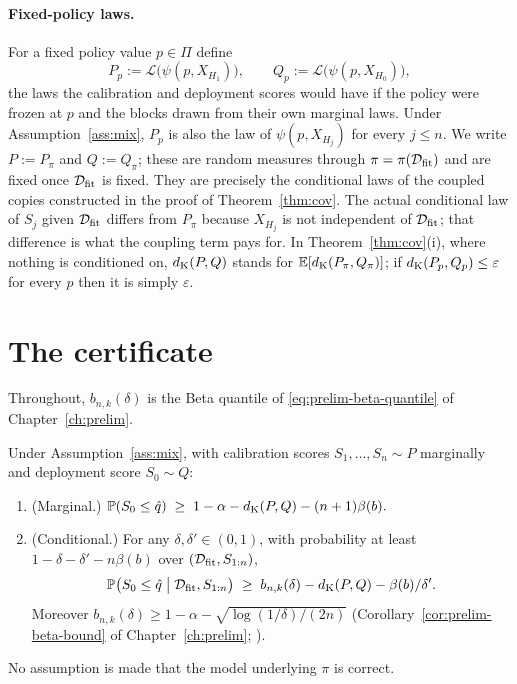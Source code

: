 \documentclass[../../../main.tex]{subfiles}
\begin{document}
\paragraph{Fixed-policy laws.} For a fixed policy value $p\in\Pi$ define
\[
P_p:=\mathcal L\big(\psi(p,X_{H_1})\big),\qquad Q_p:=\mathcal L\big(\psi(p,X_{H_0})\big),
\]
the laws the calibration and deployment scores would have if the policy were frozen at $p$ and the blocks drawn from their own marginal laws. Under Assumption~\ref{ass:mix}, $P_p$ is also the law of $\psi(p,X_{H_j})$ for every $j\le n$. We write $P:=P_\pi$ and $Q:=Q_\pi$; these are random measures through $\pi=\pi(\mathcal D_{\mathrm{fit}})$ and are fixed once $\mathcal D_{\mathrm{fit}}$ is fixed. They are precisely the conditional laws of the coupled copies constructed in the proof of Theorem~\ref{thm:cov}. The actual conditional law of $S_j$ given $\mathcal D_{\mathrm{fit}}$ differs from $P_\pi$ because $X_{H_j}$ is not independent of $\mathcal D_{\mathrm{fit}}$; that difference is what the coupling term pays for. In Theorem~\ref{thm:cov}(i), where nothing is conditioned on, $d_{\mathrm{K}}(P,Q)$ stands for $\mathbb{E}[d_{\mathrm{K}}(P_\pi,Q_\pi)]$; if $d_{\mathrm{K}}(P_p,Q_p)\le\varepsilon$ for every $p$ then it is simply $\varepsilon$.

\section{The certificate}\label{sec:cert-theorem}

Throughout, $b_{n,k}(\delta)$ is the Beta quantile of \eqref{eq:prelim-beta-quantile} of Chapter~\ref{ch:prelim}.

\begin{theorem}\label{thm:cov}
Under Assumption~\ref{ass:mix}, with calibration scores $S_1,\dots,S_n\sim P$ marginally and deployment score $S_0\sim Q$:
\begin{enumerate}[nosep,label=(\roman*)]
\item (Marginal.) $\displaystyle \mathbb{P}(S_0\le\hat q)\;\ge\;1-\alpha-d_{\mathrm{K}}(P,Q)-(n+1)\beta(b).$
\item (Conditional.) For any $\delta,\delta'\in(0,1)$, with probability at least $1-\delta-\delta'-n\beta(b)$ over $(\mathcal D_{\mathrm{fit}},S_{1:n})$,
\[
\mathbb{P}\big(S_0\le\hat q\;\big|\;\mathcal D_{\mathrm{fit}},S_{1:n}\big)\;\ge\;b_{n,k}(\delta)-d_{\mathrm{K}}(P,Q)-\beta(b)/\delta' .
\]
Moreover $b_{n,k}(\delta)\ge1-\alpha-\sqrt{\log(1/\delta)/(2n)}$ (Corollary~\ref{cor:prelim-beta-bound} of Chapter~\ref{ch:prelim}; \citep[Prop.~2a, p.~478]{vovk2012}).
\end{enumerate}
No assumption is made that the model underlying $\pi$ is correct.
\end{theorem}
\end{document}
